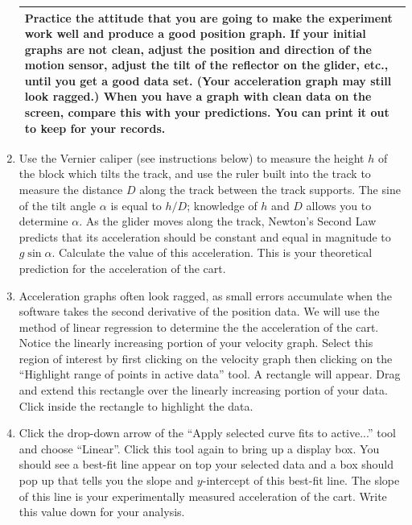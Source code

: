 \begin{enumerate}
\begin{center}
\begin{tabular}{|p{14cm}|}
\hline\tstrut
Practice the attitude that you are going to make the experiment work well and produce a good position graph.  If your initial graphs are not clean, adjust the position and direction of the motion sensor, adjust the tilt of the reflector on the glider, etc., until you get a good data set.  (Your acceleration graph may still look ragged.)  When you have a graph with clean data on the screen, compare this with your predictions.  You can print it out to keep for your records.  \bstrut\\
\hline
\end{tabular}
\end{center}

\item Use the Vernier caliper (see instructions below) to measure the height \(h\) of the block which tilts the track, and use the ruler built into the track to measure the distance \(D\) along the track between the track supports.  The sine of the tilt angle \(\alpha\) is equal to \(h/D\); knowledge of \(h\) and \(D\) allows you to determine \(\alpha\).  As the glider moves along the track, Newton's Second Law predicts that its acceleration should be constant and equal in magnitude to \(g\sin\alpha\).  Calculate the value of this acceleration.  This is your theoretical prediction for the acceleration of the cart.

\item Acceleration graphs often look ragged, as small errors accumulate when the software takes the second derivative of the position data.  We will use the method of linear regression to determine the the acceleration of the cart.  Notice the linearly increasing portion of your velocity graph.  Select this region of interest by first clicking on the velocity graph then clicking on the ``Highlight range of points in active data'' tool.  A rectangle will appear.  Drag and extend this rectangle over the linearly increasing portion of your data.  Click inside the rectangle to highlight the data.

\item Click the drop-down arrow of the ``Apply selected curve fits to active...'' tool and choose ``Linear''.  Click this tool again to bring up a display box.  You should see a best-fit line appear on top your selected data and a box should pop up that tells you the slope and  \(y\)-intercept of this best-fit line.  The slope of this line is your experimentally measured acceleration of the cart.  Write this value down for your analysis. 


\end{enumerate}
